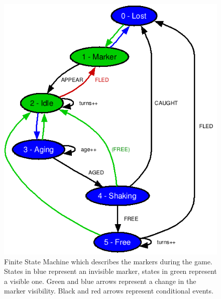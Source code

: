 \begin{figure}
	\begin{center}
		\includegraphics[width=\columnwidth]{report/images/marker.png}
	\end{center}
	\caption[Marker States]{Finite State Machine which describes the markers during the game. States in blue represent an invisible marker, states in green represent a visible one. Green and blue arrows represent a change in the marker visibility. Black and red arrows represent conditional events.}
	\label{fig:fnm}
\end{figure}

